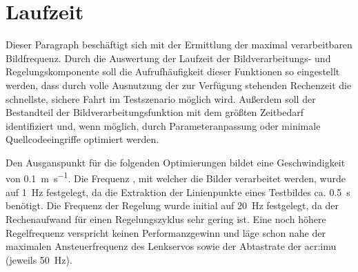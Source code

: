 \section{Laufzeit \dcsecondauthorshort}
\label{ssec:evaluation:messungen:laufzeit}
Dieser Paragraph beschäftigt sich mit der Ermittlung der maximal verarbeitbaren Bildfrequenz. Durch die Auswertung der Laufzeit der Bildverarbeitungs- und  Regelungskomponente soll die Aufrufhäufigkeit dieser Funktionen so eingestellt werden, dass durch volle Ausnutzung der zur Verfügung stehenden Rechenzeit die schnellste, sichere Fahrt im Testszenario möglich wird.
Außerdem soll der Bestandteil der Bildverarbeitungsfunktion mit dem größten Zeitbedarf identifiziert und, wenn möglich, durch Parameteranpassung oder minimale Quellcodeeingriffe optimiert werden.


Den Ausganspunkt für die folgenden Optimierungen bildet eine Geschwindigkeit von
\SI{0.1}{\metre\per\second}. Die Frequenz , mit welcher die Bilder verarbeitet werden, wurde auf \SI{1}{\hertz} festgelegt, da die Extraktion der Linienpunkte eines Testbildes ca. \SI{0.5}{\second} benötigt. Die Frequenz der Regelung  wurde initial auf \SI{20}{\hertz} festgelegt, da der Rechenaufwand für einen Regelungszyklus sehr gering ist. Eine noch höhere Regelfrequenz verspricht keinen Performanzgewinn und läge schon nahe der maximalen Ansteuerfrequenz des Lenkservos sowie der Abtastrate der \gls{acr:imu} (jeweils \SI{50}{\hertz}).

